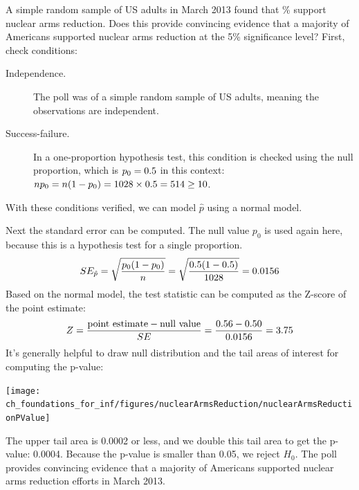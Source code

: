 \begin{examplewrap}
\begin{nexample}{A simple random sample of
    \gallupnucleararmspollsize{} US adults
    in March 2013 found that
    \gallupnucleararmspollpercent{}\% support nuclear arms
    reduction.
    Does this provide convincing evidence that a majority
    of Americans supported nuclear arms reduction at the
    5\% significance level?} \label{NuclearArmsInferenceExample}
  First, check conditions:
  \begin{description}
  \item[Independence.] The poll was of a simple random sample
      of US adults, meaning the observations are independent.
  \item[Success-failure.] In a one-proportion hypothesis test,
      this condition is checked using the null proportion,
      which is $p_0 = 0.5{}$
      in this context:
      $n p_0 = n (1 - p_0)
          = 1028{} \times
              0.5{}
          = 514{} \geq 10$.
  \end{description}
  With these conditions verified,
  we can model $\hat{p}$ using a normal model.

  Next the standard error can be computed.
  The null value $p_0$ is used again here,
  because this is a hypothesis test for a single proportion.
  \begin{align*}
  SE_{\hat{p}}
      = \sqrt{\frac{p_0 (1 - p_0)}{n}}
      = \sqrt{\frac{0.5{}
          (1 - 0.5{})}
          {1028{}}}
      = 0.0156{}
  \end{align*}
  Based on the normal model, the test statistic can be
  computed as the Z-score of the point estimate:
  \begin{align*}
  Z = \frac{\text{point estimate} - \text{null value}}{SE}
      = \frac{0.56{} - 0.50}
          {0.0156{}}
      = 3.75
  \end{align*}
  It's generally helpful to draw null distribution and
  the tail areas of interest for computing the p-value:
  \begin{center}
  \texttt{[image: ch\_foundations\_for\_inf/figures/nuclearArmsReduction/nuclearArmsReductionPValue]}
  \end{center}
  The upper tail area is 0.0002 or less,
  and we double this tail area to get the p-value: 0.0004.
  Because the p-value is smaller than 0.05, we reject $H_0$.
  The poll provides convincing evidence that a majority
  of Americans supported nuclear arms reduction efforts
  in March 2013.
\end{nexample}
\end{examplewrap}

